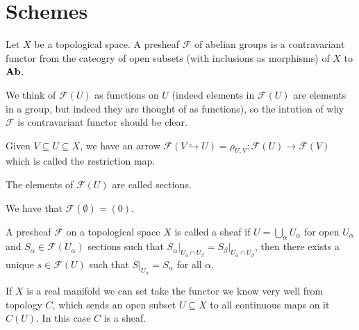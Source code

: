 \documentclass[11pt,a4paper]{article}
\begin{document}
\newpage

\section{Schemes}

\renewcommand{\F}{\mathcal F}

\begin{definition}[Presheaf]
  Let $X$ be a topological space.
  A presheaf $\F$ of abelian groups is a contravariant functor
  from the cateogry of open subsets (with inclusions as morphisms)
  of $X$ to $\mathbf{Ab}$.
\end{definition}

\begin{remark}
  We think of $\F(U)$ as functions on $U$ (indeed elements in $\F(U)$
  are elements in a group, but indeed they are thought of as functions),
  so the intution of why $\F$ is contravariant functor
  should be clear.
\end{remark}

\begin{definition}
  Given $V \subseteq U \subseteq X$,
  we have an arrow $\F(V \hookrightarrow U) = \rho_{U,V} \colon \F(U) \to \F(V)$
  which is called the restriction map.
\end{definition}

\begin{definition}[Section]
  The elements of $\F(U)$ are called sections.
\end{definition}

\begin{remark}
  We have that $\F(\emptyset) = (0)$.
\end{remark}

\begin{definition}[Sheaf]
  A presheaf $\F$ on a topological space $X$
  is called a sheaf if $U = \bigcup_{\alpha} U_{\alpha}$ for open
  $U_{\alpha}$ and $S_{\alpha} \in \F(U_{\alpha})$ sections such that
  $S_{\alpha}\vert_{U_{\alpha} \cap U_{\beta}} =
   S_{\beta}\vert_{U_{\alpha} \cap U_{\beta}}$,
  then there exists a unique $s \in \F(U)$ such that
  $S\vert_{U_{\alpha}} = S_{\alpha}$ for all $\alpha$.
\end{definition}

\begin{example}
  If $X$ is a real manifold we can set
  take the functor we know very well from topology $C$,
  which sends an open subset $U \subseteq X$ to
  all continuous maps on it $C(U)$.
  In this case $C$ is a sheaf.
\end{example}
\end{document}
